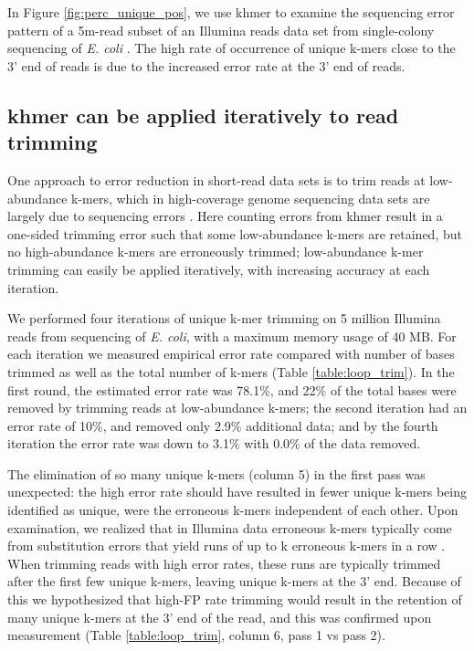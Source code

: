 \documentclass[10pt]{article}
\begin{document}
In Figure \ref{fig:perc_unique_pos}, we use khmer to examine the
sequencing error pattern of a 5m-read subset of an Illumina reads
data set from single-colony sequencing of {\em E. coli}
\cite{pubmed21926975}.  The high rate of occurrence of unique k-mers
close to the 3' end of reads is due to the increased error rate at the
3' end of reads.

\subsection*{khmer can be applied iteratively to read trimming}

One approach to error reduction in short-read data sets is to trim
reads at low-abundance k-mers, which in high-coverage genome
sequencing data sets are largely due to sequencing errors \cite{Kelley2010}.
Here counting errors from khmer result in a one-sided trimming
error such that some low-abundance k-mers are retained, but no
high-abundance k-mers are erroneously trimmed; low-abundance k-mer
trimming can easily be applied iteratively, with increasing accuracy
at each iteration.

We performed four iterations of unique k-mer trimming on 5 million
Illumina reads from sequencing of {\em E. coli}, with a maximum memory
usage of 40 MB.  For each iteration we measured empirical error rate
compared with number of bases trimmed as well as the total number of
k-mers
(Table \ref{table:loop_trim}).
In the first round, the estimated error
rate was 78.1\%, and 22\% of the total bases were removed by trimming
reads at low-abundance k-mers; the second iteration had an error
rate of 10\%, and removed only 2.9\% additional data; and by
the fourth iteration the error rate was down to 3.1\% with 0.0\% of the data removed.

The elimination of so many unique k-mers (column 5) in the first pass
was unexpected: the high error rate should have resulted in
fewer unique k-mers being identified as unique, were the erroneous
k-mers independent of each other. Upon examination, we realized that
in Illumina data erroneous k-mers typically come from substitution
errors that yield runs of up to k erroneous k-mers in a row \cite{Kelley2010}.  
When trimming reads with high error rates,
these runs are typically trimmed after the first few unique k-mers,
leaving unique k-mers at the 3' end.
Because of this we hypothesized that high-FP rate trimming would
result in the retention of many unique k-mers at the 3' end of the
read, and this was confirmed upon measurement (Table \ref{table:loop_trim}, column 6, 
pass 1 vs pass 2).
\end{document}
